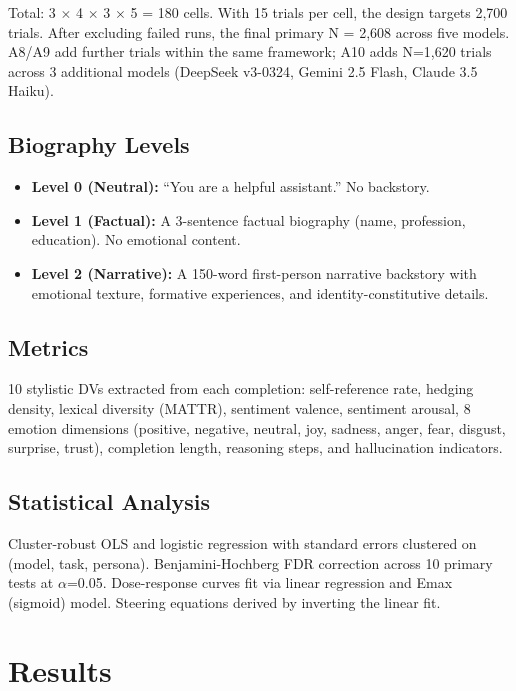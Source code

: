 \documentclass[11pt,a4paper]{article}
\begin{document}
Total: 3 $\times$ 4 $\times$ 3 $\times$ 5 = 180 cells. With 15 trials per cell, the design targets 2,700 trials. After excluding failed runs, the final primary N = 2,608 across five models. A8/A9 add further trials within the same framework; A10 adds N=1,620 trials across 3 additional models (DeepSeek v3-0324, Gemini 2.5 Flash, Claude 3.5 Haiku).

\subsection{Biography Levels}

\begin{itemize}[nosep]
\item \textbf{Level 0 (Neutral):} ``You are a helpful assistant.'' No backstory.
\item \textbf{Level 1 (Factual):} A 3-sentence factual biography (name, profession, education). No emotional content.
\item \textbf{Level 2 (Narrative):} A 150-word first-person narrative backstory with emotional texture, formative experiences, and identity-constitutive details.
\end{itemize}

\subsection{Metrics}

10 stylistic DVs extracted from each completion: self-reference rate, hedging density, lexical diversity (MATTR), sentiment valence, sentiment arousal, 8 emotion dimensions (positive, negative, neutral, joy, sadness, anger, fear, disgust, surprise, trust), completion length, reasoning steps, and hallucination indicators.

\subsection{Statistical Analysis}

Cluster-robust OLS and logistic regression with standard errors clustered on (model, task, persona). Benjamini-Hochberg FDR correction across 10 primary tests at $\alpha$=0.05. Dose-response curves fit via linear regression and Emax (sigmoid) model. Steering equations derived by inverting the linear fit.

\section{Results}
\label{sec:results}
\end{document}
